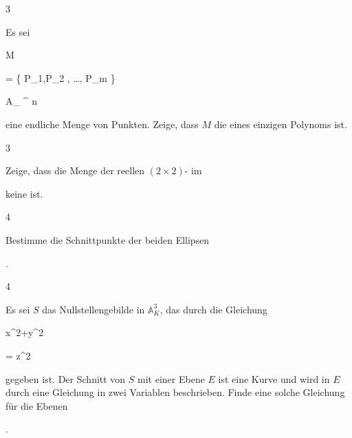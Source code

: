 {} {}




{3}


{


Es sei


\mavergleichskette


{\vergleichskette


{ M
}


{ = }{ \{ P_1,P_2 , \ldots , P_m \}
}


{ \subseteq }{ { {\mathbb A}_{ \R }^{  n   } }
}


{    }{
}


{   }{
}


}
{}{}{}
eine endliche Menge von Punkten. Zeige, dass $M$ die
eines einzigen Polynoms ist.


}


{} {}




{3}


{


Zeige, dass die Menge der reellen
$(2\times 2)$-
im


 keine
ist.


}


{} {}




{4}


{


Bestimme die Schnittpunkte der beiden Ellipsen


 { . }


}


{} {}




{4}


{


Es sei $S$ das Nullstellengebilde in ${ {\mathbb A}_{ K }^{  3   } }$, das durch die Gleichung


\mavergleichskettedisp


{\vergleichskette


{ x^2+y^2
}


{ =} { z^2
}


{ } {
}


{ } {
}


{ } {
}


}
{}{}{}
gegeben ist. Der Schnitt von $S$ mit einer Ebene $E$ ist eine Kurve und wird in $E$ durch eine Gleichung in zwei
 {} {}
Variablen beschrieben. Finde eine solche Gleichung für die Ebenen


 { . }


}


{} {}
